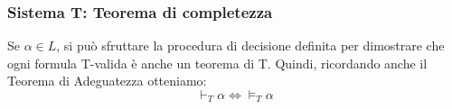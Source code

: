 \documentclass[notheorem,aspectratio=169]{beamer}
\begin{document}












\begin{frame}
\frametitle{Sistema T: Teorema di completezza}
Se $\alpha \in L$, si può sfruttare la procedura di decisione definita
per dimostrare che ogni formula T-valida è anche un teorema di T.
Quindi, ricordando anche il Teorema di Adeguatezza otteniamo:
$$\vdash_T \alpha \Leftrightarrow \vDash_T \alpha$$
\end{frame}
\end{document}
